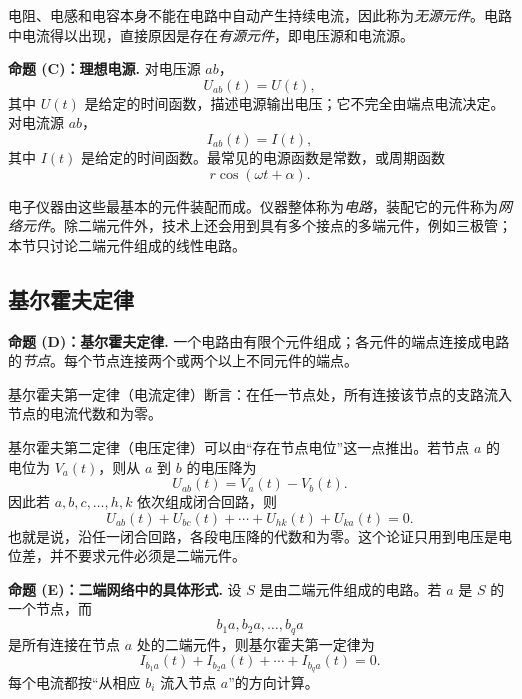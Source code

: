 电阻、电感和电容本身不能在电路中自动产生持续电流，因此称为\emph{无源元件}。电路中电流得以出现，直接原因是存在\emph{有源元件}，即电压源和电流源。

\medskip
\noindent\textbf{命题 (C)：理想电源.}
对电压源 \(ab\)，
\begin{equation}
 U_{ab}(t)=U(t),
 \label{eq:ch2-13-voltage-source}
\end{equation}
其中 \(U(t)\) 是给定的时间函数，描述电源输出电压；它不完全由端点电流决定。对电流源 \(ab\)，
\begin{equation}
 I_{ab}(t)=I(t),
 \label{eq:ch2-13-current-source}
\end{equation}
其中 \(I(t)\) 是给定的时间函数。最常见的电源函数是常数，或周期函数
\begin{equation}
 r\cos(\omega t+\alpha).
 \label{eq:ch2-13-harmonic-source}
\end{equation}

电子仪器由这些最基本的元件装配而成。仪器整体称为\emph{电路}，装配它的元件称为\emph{网络元件}。除二端元件外，技术上还会用到具有多个接点的多端元件，例如三极管；本节只讨论二端元件组成的线性电路。

\subsection*{基尔霍夫定律}

\medskip
\noindent\textbf{命题 (D)：基尔霍夫定律.}
一个电路由有限个元件组成；各元件的端点连接成电路的\emph{节点}。每个节点连接两个或两个以上不同元件的端点。

基尔霍夫第一定律（电流定律）断言：在任一节点处，所有连接该节点的支路流入节点的电流代数和为零。

基尔霍夫第二定律（电压定律）可以由“存在节点电位”这一点推出。若节点 \(a\) 的电位为 \(V_a(t)\)，则从 \(a\) 到 \(b\) 的电压降为
\[
 U_{ab}(t)=V_a(t)-V_b(t).
\]
因此若 \(a,b,c,\ldots,h,k\) 依次组成闭合回路，则
\begin{equation}
 U_{ab}(t)+U_{bc}(t)+\cdots+U_{hk}(t)+U_{ka}(t)=0.
 \label{eq:ch2-13-kvl-cycle}
\end{equation}
也就是说，沿任一闭合回路，各段电压降的代数和为零。这个论证只用到电压是电位差，并不要求元件必须是二端元件。

\medskip
\noindent\textbf{命题 (E)：二端网络中的具体形式.}
设 \(S\) 是由二端元件组成的电路。若 \(a\) 是 \(S\) 的一个节点，而
\[
 b_1a,b_2a,\ldots,b_qa
\]
是所有连接在节点 \(a\) 处的二端元件，则基尔霍夫第一定律为
\begin{equation}
 I_{b_1a}(t)+I_{b_2a}(t)+\cdots+I_{b_qa}(t)=0.
 \label{eq:ch2-13-kcl-at-node}
\end{equation}
每个电流都按“从相应 \(b_i\) 流入节点 \(a\)”的方向计算。

